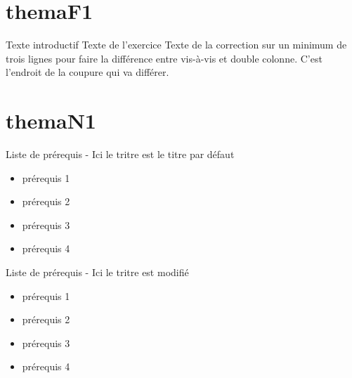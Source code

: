 \documentclass[nocrop]{sesamanuel}
\begin{document}
\themaF
\chapter{themaF1}
\cours  
\begin{methode}
  Texte introductif
  \exercice
  Texte de l’exercice
  \correction
  Texte de la correction sur un minimum de trois lignes pour faire la
  différence entre vis-à-vis et double colonne. C’est l’endroit de la
  coupure qui va différer.
\end{methode}

\themaN
\chapter{themaN1}

\begin{prerequis}
    Liste de prérequis - Ici le tritre est le titre par défaut
    \begin{itemize}
    \item prérequis 1
    \item prérequis 2
    \item prérequis 3
    \item prérequis 4    
    \end{itemize}
\end{prerequis}

\begin{prerequis}
    Liste de prérequis - Ici le tritre est modifié
    \begin{itemize}
    \item prérequis 1
    \item prérequis 2
    \item prérequis 3
    \item prérequis 4    
    \end{itemize}
\end{prerequis}
\end{document}
